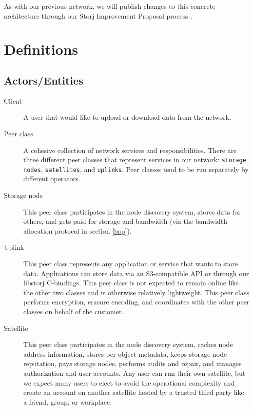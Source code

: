 \documentclass[11pt,fleqn,openany]{book}
\newcommand{\x}[1]{{\tt #1}} \newcommand{\code}[1]{{\em #1}}
\begin{document}
As with our previous network, we will publish changes to this concrete
architecture through our Storj Improvement Proposal process \cite{sips}.

\section{Definitions}

\subsection{Actors/Entities}

\begin{description}
\item[Client] A user that would like to upload or download data from the network.

\item[Peer class] A cohesive collection of network services and
  responsibilities. There are three different peer classes that represent
  services in our network: \x{storage nodes}, \x{satellites}, and \x{uplinks}.
  Peer classes   tend to be run separately by different operators.

\item[Storage node] This peer class participates in the node discovery
  system, stores data for others, and gets paid for storage and bandwidth
  (via the bandwidth allocation protocol in section \ref{bap}).

\item[Uplink] This peer class represents any application or
  service that wants to store data. Applications can store data via an
  S3-compatible API or through our libstorj C-bindings. This peer class
  is not expected to remain online like the other two classes and is otherwise
  relatively lightweight. This peer class performs encryption, erasure encoding,
  and coordinates with the other peer classes on behalf of the customer.

\item[Satellite] This peer class participates in the node discovery system,
  caches node address information, stores per-object metadata, keeps storage
  node reputation, pays storage nodes, performs audits and repair, and manages
  authorization and user accounts.
  Any user can run their own satellite, but we expect many users
  to elect to avoid the operational complexity and create an account on
  another satellite hosted by a trusted third party like a friend, group, or
  workplace.
\end{description}
\end{document}
